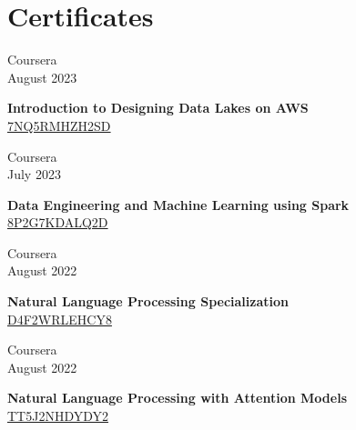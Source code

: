 \documentclass[10pt,a4paper]{article}
\newcommand{\lmpratio}{0.15}
\newcommand{\rmpratio}{0.74}
\newcommand{\horizontalSpace}{0.05\textwidth}
\newcommand{\sectionMain}[1]{\textbf{#1}}
\begin{document}
	\newpage
	
	\section*{Certificates}	

        \begin{minipage}[t]{\lmpratio\textwidth}
		Coursera\\August 2023
	\end{minipage}
	\hspace{\horizontalSpace}
	\begin{minipage}[t]{\rmpratio\textwidth}
		\sectionMain{Introduction to Designing Data Lakes on AWS}\\
            \href{https://www.coursera.org/account/accomplishments/certificate/7NQ5RMHZH2SD}{7NQ5RMHZH2SD}
	\end{minipage}
	\vspace{1cm}

        \begin{minipage}[t]{\lmpratio\textwidth}
		Coursera\\July 2023
	\end{minipage}
	\hspace{\horizontalSpace}
	\begin{minipage}[t]{\rmpratio\textwidth}
		\sectionMain{Data Engineering and Machine Learning using Spark}\\
            \href{https://www.coursera.org/account/accomplishments/certificate/8P2G7KDALQ2D}{8P2G7KDALQ2D}
	\end{minipage}
	\vspace{1cm}

        \begin{minipage}[t]{\lmpratio\textwidth}
		Coursera\\August 2022
	\end{minipage}
	\hspace{\horizontalSpace}
	\begin{minipage}[t]{\rmpratio\textwidth}
		\sectionMain{Natural Language Processing Specialization}\\
            \href{https://www.coursera.org/account/accomplishments/specialization/certificate/D4F2WRLEHCY8}{D4F2WRLEHCY8}
	\end{minipage}
	\vspace{1cm}

        \begin{minipage}[t]{\lmpratio\textwidth}
		Coursera\\August 2022
	\end{minipage}
	\hspace{\horizontalSpace}
	\begin{minipage}[t]{\rmpratio\textwidth}
		\sectionMain{Natural Language Processing with Attention Models}\\
		\href{https://www.coursera.org/account/accomplishments/certificate/TT5J2NHDYDY2}{TT5J2NHDYDY2}
	\end{minipage}
	\vspace{1cm}
\end{document}
